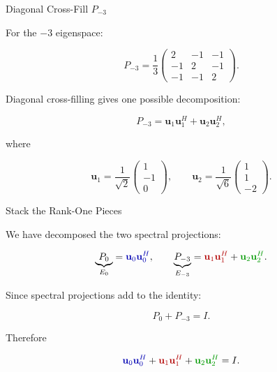 \documentclass[10pt]{beamer}
\theoremstyle{definition}
\newcommand{\rd}[1]{{\color{red!70!black}#1}}
\newcommand{\bl}[1]{{\color{blue!70!black}#1}}
\newcommand{\gn}[1]{{\color{green!60!black}#1}}
\begin{document}
\begin{frame}{Diagonal Cross-Fill $P_{-3}$}

For the $-3$ eigenspace:

$$
P_{-3}=\frac13
\begin{pmatrix}
2&-1&-1\\
-1&2&-1\\
-1&-1&2
\end{pmatrix}.
$$

\vfill\pause

Diagonal cross-filling gives one possible decomposition:

$$
P_{-3}
=\mathbf{u}_1\mathbf{u}_1^H+\mathbf{u}_2\mathbf{u}_2^H,
$$

where

$$
\mathbf{u}_1=\frac{1}{\sqrt2}\begin{pmatrix}1\\-1\\0\end{pmatrix},
\qquad
\mathbf{u}_2=\frac{1}{\sqrt6}\begin{pmatrix}1\\1\\-2\end{pmatrix}.
$$

\end{frame}


\begin{frame}{Stack the Rank-One Pieces}

We have decomposed the two spectral projections:

$$
\underbrace{P_0}_{E_0}
=\bl{\mathbf{u}_0\mathbf{u}_0^H},
\qquad
\underbrace{P_{-3}}_{E_{-3}}
=\rd{\mathbf{u}_1\mathbf{u}_1^H}+\gn{\mathbf{u}_2\mathbf{u}_2^H}.
$$

\vfill\pause

Since spectral projections add to the identity:

$$
P_0+P_{-3}=I.
$$

\vfill

Therefore

$$
\bl{\mathbf{u}_0\mathbf{u}_0^H}
+\rd{\mathbf{u}_1\mathbf{u}_1^H}
+\gn{\mathbf{u}_2\mathbf{u}_2^H}
=I.
$$

\end{frame}
\end{document}
